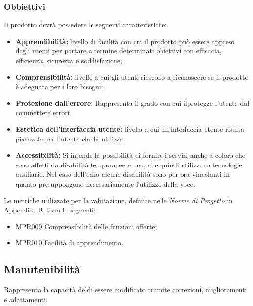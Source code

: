 \subsubsection{Obbiettivi } Il prodotto dovrà possedere le seguenti caratteristiche:
\begin{itemize}
	\item \textbf{Apprendibilità:} livello di facilità con cui il prodotto può essere appreso dagli utenti per portare a termine determinati obiettivi con efficacia, efficienza, sicurezza e soddisfazione;
	\item \textbf{Comprensibilità:} livello a cui gli utenti riescono a riconoscere se il prodotto è adeguato per i loro bisogni;
	\item \textbf{Protezione dall'errore:} Rappresenta il grado con cui ilprotegge l'utente dal commettere errori;
	\item \textbf{Estetica dell'interfaccia utente:} livello a cui un'interfaccia utente risulta piacevole per l'utente che la utilizza;
	\item \textbf{Accessibilità:} Si intende la possibilità di fornire i servizi anche a coloro che sono affetti da disabilità temporanee e non, che quindi utilizzano tecnologie ausiliarie.
	Nel caso dell'echo alcune disabilità sono per ora vincolanti in quanto presuppongono necessariamente l'utilizzo della voce.
\end{itemize}
Le metriche utilizzate per la valutazione, definite nelle \textit{Norme di Progetto} in Appendice B, sono le seguenti:
\begin{itemize}
	\item MPR009 Comprensibilità delle funzioni offerte;
	\item MPR010 Facilità di apprendimento.
\end{itemize}

\subsection{Manutenibilità}
Rappresenta la capacità deldi essere modificato tramite correzioni, miglioramenti e adattamenti.
